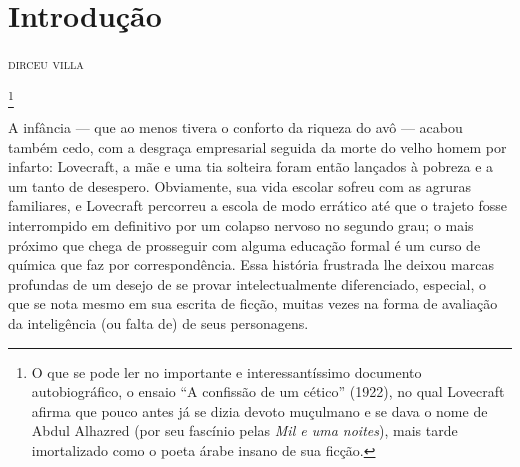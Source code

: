 

\chapter[Introdução, \emph{por Dirceu Villa}]{Introdução\smallskip{}}

\begin{flushright}
\textsc{dirceu villa}
\end{flushright}


\noindent{}\footnote{O que se pode ler no importante e interessantíssimo
  documento autobiográfico, o ensaio ``A confissão de um cético'' (1922),
  no qual Lovecraft afirma que pouco antes já se dizia devoto
  muçulmano e se dava o nome de Abdul Alhazred (por seu fascínio pelas
  \emph{Mil e uma noites}), mais tarde imortalizado como o poeta
  árabe insano de sua ficção.}

A infância --- que ao menos tivera o conforto da riqueza do avô ---
acabou também cedo, com a desgraça empresarial seguida da morte do velho
homem por infarto: Lovecraft, a mãe e uma tia solteira foram então
lançados à pobreza e a um tanto de desespero. Obviamente, sua vida
escolar sofreu com as agruras familiares, e Lovecraft percorreu a escola
de modo errático até que o trajeto fosse interrompido em definitivo por
um colapso nervoso no segundo grau; o mais próximo que chega de
prosseguir com alguma educação formal é um curso de química que faz por
correspondência. Essa história frustrada lhe deixou marcas profundas de
um desejo de se provar intelectualmente diferenciado, especial, o que se
nota mesmo em sua escrita de ficção, muitas vezes na forma de avaliação
da inteligência (ou falta de) de seus personagens.

